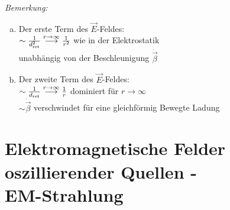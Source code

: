 \emph{Bemerkung:}
\begin{enumerate}[a)]
	\item Der erste Term des $ \vec{E} $-Feldes:\\
	$ \sim \frac{1}{d_{\textrm{ret}}^2} \overset{r \to \infty}{\longrightarrow} \frac{1}{r^2} $ wie in der Elektrostatik\\
	unabhängig von der Beschleunigung $ \dot{\vec{\beta}} $
	\item Der zweite Term des $ \vec{E} $-Feldes:\\
	$ \sim \frac{1}{d_{\textrm{ret}}} \overset{r \to \infty}{\longrightarrow} \frac{1}{r} $ dominiert für $ r \to \infty $\\[5pt]
	$ \sim \dot{\vec{\beta}} $ verschwindet für eine gleichförmig Bewegte Ladung
\end{enumerate}


\section{Elektromagnetische Felder oszillierender Quellen - \texorpdfstring{\\}{newline} EM-Strahlung}

